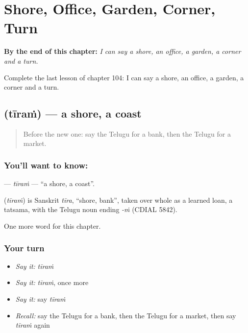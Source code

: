 
\chapter{Shore, Office, Garden, Corner, Turn}
\label{ch:te-shore-office-garden-corner-turn}

\begin{chapteropening}
\textbf{By the end of this chapter:} \emph{I can say a shore, an office, a garden, a corner and a turn.}

Complete the last lesson of chapter 104: I can say a shore, an office, a garden, a corner and a turn.
\end{chapteropening}

\section[\texorpdfstring{\te{తీరం} (tīraṁ)}{తీరం (tīraṁ)}]{ (tīraṁ) — a shore, a coast}

\label{lesson:TE-C104-tiram}



\begin{quote}
Before the new one: say the Telugu for a bank, then the Telugu for a market.
\end{quote}

\subsection*{You'll want to know: }
\textbf{} — \emph{tīraṁ} — \textquotedblleft{}a shore, a coast\textquotedblright{}.

\begin{cousinweb}
\textbf{} (\emph{tīraṁ}) is Sanskrit \emph{tīra}, \textquotedblleft{}shore, bank\textquotedblright{}, taken over whole as a learned loan, a tatsama, with the Telugu noun ending \emph{-ṁ} (CDIAL 5842).
\end{cousinweb}

\begin{grammarlens}[title={What you've built}]
One more word for this chapter.
\end{grammarlens}

\subsection*{Your turn}
\begin{itemize}
\raggedright
  \item \emph{Say it:} \emph{tīraṁ}
  \item \emph{Say it:} \emph{tīraṁ}, once more
  \item \emph{Say it:} say \emph{tīraṁ}
  \item \emph{Recall:} say the Telugu for a bank, then the Telugu for a market, then say \emph{tīraṁ} again
\end{itemize}

